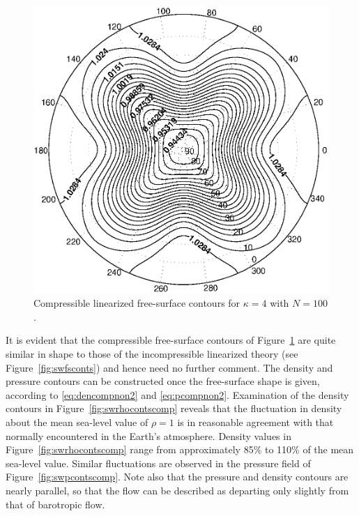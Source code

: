 \begin{figure}[htbp]
	\centering
		\includegraphics[scale=0.75]{IMAGES/swfscontscomp.eps}
	\caption{Compressible linearized free-surface contours for $\kappa=4$ with $N=100$.}
	\label{fig:swfscontscomp}
\end{figure}
It is evident that the compressible free-surface contours of Figure~\ref{fig:swfscontscomp} are quite similar in shape to those of the incompressible linearized theory (see Figure~\ref{fig:swfsconts}) and hence need no further comment. The density and pressure contours can be constructed once the free-surface shape is given, according to \eqref{eq:dencompnon2} and \eqref{eq:pcompnon2}. Examination of the density contours in Figure~\ref{fig:swrhocontscomp} reveals that the fluctuation in density about the mean sea-level value of $\rho=1$ is in reasonable agreement with that normally encountered in the Earth's atmosphere. Density values in Figure~\ref{fig:swrhocontscomp} range from approximately 85\% to 110\% of the mean sea-level value. Similar fluctuations are observed in the pressure field of Figure~\ref{fig:swpcontscomp}. Note also that the pressure and density contours are nearly parallel, so that the flow can be described as departing only slightly from that of barotropic flow.
